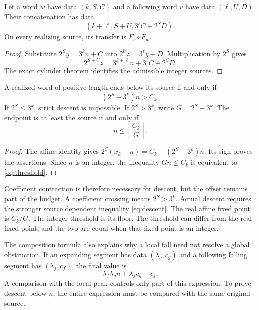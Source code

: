 \begin{proposition}[Concatenation]\label{prop:composition}
Let a word $w$ have data $(k,S,C)$ and a following word $v$ have data $(\ell,U,D)$. Their concatenation has data
\begin{equation}\label{eq:composition}
(k+\ell,S+U,3^\ell C+2^S D).
\end{equation}
On every realizing source, its transfer is $F_v\circ F_w$.
\end{proposition}
\begin{proof}
Substitute $2^S y=3^k n+C$ into $2^U z=3^\ell y+D$. Multiplication by $2^S$ gives
\[
2^{S+U}z=3^{k+\ell}n+3^\ell C+2^S D.
\]
The exact cylinder theorem identifies the admissible integer sources.
\end{proof}

\begin{theorem}\label{thm:descent}
A realized word of positive length ends below its source if and only if
\begin{equation}\label{eq:descent}
(2^S-3^k)n>C_k.
\end{equation}
If $2^S\le3^k$, strict descent is impossible. If $2^S>3^k$, write $G=2^S-3^k$. The endpoint is at least the source if and only if
\begin{equation}\label{eq:threshold}
n\le\left\lfloor\frac{C_k}{G}\right\rfloor.
\end{equation}
\end{theorem}
\begin{proof}
The affine identity gives $2^S(x_k-n)=C_k-(2^S-3^k)n$. Its sign proves the assertions. Since $n$ is an integer, the inequality $Gn\le C_k$ is equivalent to \eqref{eq:threshold}.
\end{proof}

Coefficient contraction is therefore necessary for descent, but the offset remains part of the budget. A coefficient crossing means $2^S>3^k$. Actual descent requires the stronger source dependent inequality \eqref{eq:descent}. The real affine fixed point is $C_k/G$. The integer threshold is its floor. The threshold can differ from the real fixed point, and the two are equal when that fixed point is an integer.

The composition formula also explains why a local fall need not resolve a global obstruction. If an expanding segment has data $(\lambda_g,c_g)$ and a following falling segment has $(\lambda_f,c_f)$, the final value is
\[
\lambda_f\lambda_g n+\lambda_f c_g+c_f.
\]
A comparison with the local peak controls only part of this expression. To prove descent below $n$, the entire expression must be compared with the same original source.

